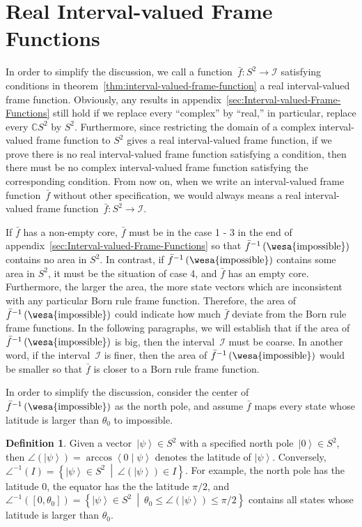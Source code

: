 \documentclass[12pt]{iopart}
\theoremstyle{plain}
\theoremstyle{definition}
\newtheorem{definition}[thm]{Definition}
\newcommand{\imposs}{{\mbox{\wesa{impossible}}}}
\newcommand{\ket}[1]{{\left\vert{#1}\right\rangle}}
\newcommand{\ip}[2]{\ensuremath{\left\langle{#1}\middle\vert{#2}\right\rangle}}
\newcommand{\set}[2]{\ensuremath{\left\{ {#1}~\middle|~{#2}\right\} }}
\begin{document}
\section{Real Interval-valued Frame Functions\label{sec:Real-Interval-valued-Frame}}

In order to simplify the discussion, we call a function~$\bar{f}:S^{2}\rightarrow\mathscr{I}$
satisfying conditions in theorem~\ref{thm:interval-valued-frame-function}
a real interval-valued frame function. Obviously, any results in appendix~\ref{sec:Interval-valued-Frame-Functions}
still hold if we replace every ``complex'' by ``real,'' in particular,
replace every $\mathbb{C}S^{2}$ by $S^{2}$. Furthermore, since restricting
the domain of a complex interval-valued frame function to $S^{2}$
gives a real interval-valued frame function, if we prove there is
no real interval-valued frame function satisfying a condition, then
there must be no complex interval-valued frame function satisfying
the corresponding condition. From now on, when we write an interval-valued
frame function~$\bar{f}$ without other specification, we would always
means a real interval-valued frame function~$\bar{f}:S^{2}\rightarrow\mathscr{I}$.

If $\bar{f}$ has a non-empty core, $\bar{f}$ must be in the case
1 - 3 in the end of appendix~\ref{sec:Interval-valued-Frame-Functions}
so that $\bar{f}^{-1}\left(\imposs\right)$ contains no area in $S^{2}$.
In contrast, if $\bar{f}^{-1}\left(\imposs\right)$ contains some
area in $S^{2}$, it must be the situation of case 4, and $\bar{f}$
has an empty core. Furthermore, the larger the area, the more state
vectors which are inconsistent with any particular Born rule frame
function. Therefore, the area of $\bar{f}^{-1}\left(\imposs\right)$
could indicate how much $\bar{f}$ deviate from the Born rule frame
functions. In the following paragraphs, we will establish that if
the area of $\bar{f}^{-1}\left(\imposs\right)$ is big, then the interval~$\mathscr{I}$
must be coarse. In another word, if the interval~$\mathscr{I}$ is
finer, then the area of $\bar{f}^{-1}\left(\imposs\right)$ would
be smaller so that $\bar{f}$ is closer to a Born rule frame function.

In order to simplify the discussion, consider the center of $\bar{f}^{-1}\left(\imposs\right)$
as the north pole, and assume $\bar{f}$ maps every state whose latitude
is larger than $\theta_{0}$ to impossible.

\begin{definition}Given a vector~$\ket{\psi}\in S^{2}$ with a specified
north pole~$\ket{0}\in S^{2}$, then $\angle\left(\ket{\psi}\right)=\arccos\ip{0}{\psi}$
denotes the latitude of $\ket{\psi}$. Conversely, $\angle^{-1}\left(I\right)=\set{\ket{\psi}\in S^{2}}{\angle\left(\ket{\psi}\right)\in I}$.
For example, the north pole has the latitude $0$, the equator has
the the latitude $\pi / 2$, and $\angle^{-1}\left(\left[0,\theta_{0}\right]\right)=\set{\ket{\psi}\in S^{2}}{\theta_{0}\le\angle\left(\ket{\psi}\right)\le\pi / 2}$
contains all states whose latitude is larger than $\theta_{0}$.\end{definition}
\end{document}
